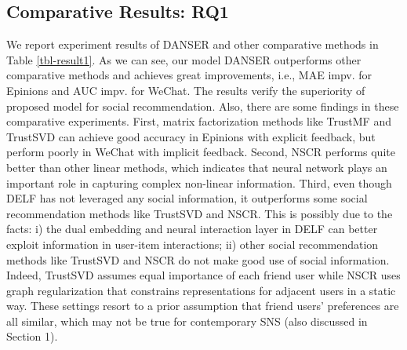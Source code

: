\documentclass[sigconf]{acmart}
\begin{document}
\begin{comment}
The definitions of these metrics are as follows:

\emph{MAE:} Mean Absolute Error (MAE) measures the overall  distance between predicted ratings and ground-truth values:

where  denotes the total number of rating records,  and  denote the predicted and ground-truth ratings for user  on item , respectively. 

\emph{RMSE:} Root Mean Square Error (RMSE) measures the overall  distance between predicted ratings and ground-truth values:


\emph{AUC:} Area Under Curve (AUC) refers to the area under the ROC curve, and measures the probability that a recommender system ranks a positive user-item interaction higher than negative ones:

where  ,  are the sets of observed positive item  and unobserved item  for user u respectively, and  is the count function returning  if  and 0 otherwise. 
\end{comment}

\subsection{Comparative Results: RQ1}

We report experiment results of DANSER and other comparative methods in Table \ref{tbl-result1}. As we can see, our model DANSER outperforms other comparative methods and achieves great improvements, i.e.,  MAE impv. for Epinions and  AUC impv. for WeChat. The results verify the superiority of proposed model for social recommendation. Also, there are some findings in these comparative experiments. First, matrix factorization methods like TrustMF and TrustSVD can achieve good accuracy in Epinions with explicit feedback, but perform poorly in WeChat with implicit feedback. Second, NSCR performs quite better than other linear methods, which indicates that neural network plays an important role in capturing complex non-linear information. Third, even though DELF has not leveraged any social information, it outperforms some social recommendation methods like TrustSVD and NSCR. This is possibly due to the facts: i) the dual embedding and neural interaction layer in DELF can better exploit information in user-item interactions; ii) other social recommendation methods like TrustSVD and NSCR do not make good use of social information. Indeed, TrustSVD assumes equal importance of each friend user while NSCR uses graph regularization that constrains representations for adjacent users in a static way. These settings resort to a prior assumption that friend users' preferences are all similar, which may not be true for contemporary SNS (also discussed in Section 1).
\end{document}
